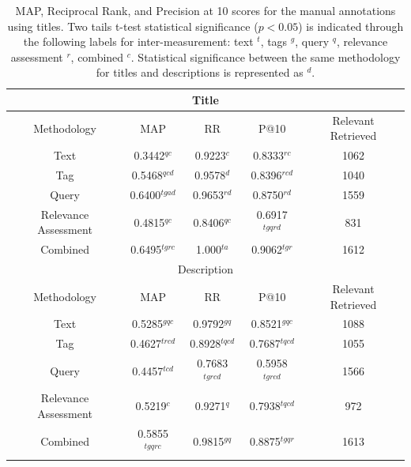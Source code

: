 \begin{table}[ht]
    \begin{tabular}{|c|c|c|c|c|}
        \multicolumn{5}{c}{Title}\\ \hline
         Methodology & MAP & RR & P@10 & Relevant Retrieved \\ \hline
         Text & 0.3442$^{qc}$ & 0.9223$^{c}$ & 0.8333$^{rc}$ & 1062 \\ \hline
         Tag & 0.5468$^{qcd}$ & 0.9578$^{d}$ & 0.8396$^{rcd}$ & 1040 \\ \hline
         Query & 0.6400$^{tgad}$ & 0.9653$^{rd}$ & 0.8750$^{rd}$ & 1559 \\ \hline
         Relevance Assessment & 0.4815$^{qc}$ & 0.8406$^{qc}$ & 0.6917$^{tgqrd}$ & 831 \\ \hline
         Combined & 0.6495$^{tgrc}$ & 1.000$^{ta}$ & 0.9062$^{tgr}$ & 1612 \\ \hline
         \multicolumn{5}{c}{Description} \\ \hline
         Methodology & MAP & RR & P@10 & Relevant Retrieved \\ \hline
         Text & 0.5285$^{gqc}$ & 0.9792$^{gq}$ & 0.8521$^{gqc}$ & 1088 \\ \hline
         Tag & 0.4627$^{trcd}$ & 0.8928$^{tqcd}$ & 0.7687$^{tqcd}$ & 1055 \\ \hline
         Query & 0.4457$^{tcd}$ & 0.7683$^{tgrcd}$ & 0.5958$^{tgrcd}$ & 1566 \\ \hline
         Relevance Assessment & 0.5219$^{c}$ & 0.9271$^{q}$ & 0.7938$^{tqcd}$ & 972 \\ \hline
         Combined & 0.5855$^{tgqrc}$ & 0.9815$^{gq}$ & 0.8875$^{tgqr}$ & 1613 \\ \hline         
    \end{tabular}
    \caption{MAP, Reciprocal Rank, and Precision at 10 scores for the manual annotations using titles. Two tails t-test statistical significance ($p<0.05$) is indicated through the following labels for inter-measurement: text $^t$, tags $^g$, query $^q$, relevance assessment $^r$, combined $^c$. Statistical significance between the same methodology for titles and descriptions is represented as $^d$.}
    \label{table:manual-results}
\end{table}

